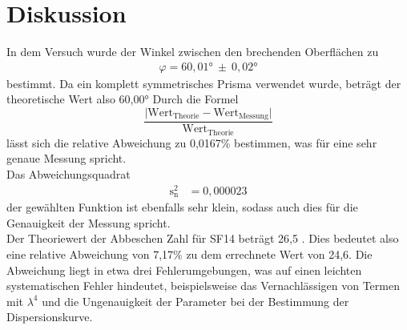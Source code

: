 \section{Diskussion}
\label{sec:Diskussion}
In dem Versuch wurde der Winkel zwischen den brechenden Oberflächen zu
\begin{align*}
  \varphi = 60,01° \: \pm \: 0,02 °
\end{align*}
bestimmt. Da ein komplett symmetrisches Prisma verwendet wurde, beträgt der
theoretische Wert also 60,00°
Durch die Formel
\begin{equation*}
  \frac{\lvert \text{Wert}_{\text{Theorie}}-\text{Wert}_{\text{Messung}}\rvert}{\text{Wert}_{\text{Theorie}}}
  \label{eqn:abw}
\end{equation*}
lässt sich die relative Abweichung zu 0,0167\% bestimmen, was für eine sehr genaue
Messung spricht. \\
Das Abweichungsquadrat
\begin{align*}
  \text{s}_{\text{n}}^2 &= 0,000023
\end{align*}
der gewählten Funktion ist ebenfalls sehr klein, sodass auch dies für die Genauigkeit der
Messung spricht. \\
Der Theoriewert der Abbeschen Zahl für SF14 beträgt 26,5 \cite{Abbe}.
Dies bedeutet also eine relative Abweichung von 7,17\%
zu dem errechnete Wert von 24,6. Die Abweichung liegt in etwa drei Fehlerumgebungen,
was auf einen leichten systematischen Fehler hindeutet,
beispielsweise das Vernachlässigen von Termen mit $\lambda^4$ und die Ungenauigkeit
der Parameter bei der Bestimmung der Dispersionskurve.
